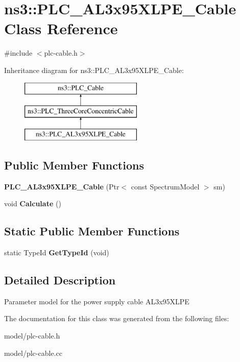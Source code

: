 \hypertarget{classns3_1_1PLC__AL3x95XLPE__Cable}{\section{ns3\-:\-:\-P\-L\-C\-\_\-\-A\-L3x95\-X\-L\-P\-E\-\_\-\-Cable \-Class \-Reference}
\label{classns3_1_1PLC__AL3x95XLPE__Cable}
}


{\ttfamily \#include $<$plc-\/cable.\-h$>$}

\-Inheritance diagram for ns3\-:\-:\-P\-L\-C\-\_\-\-A\-L3x95\-X\-L\-P\-E\-\_\-\-Cable\-:\begin{figure}[H]
\begin{center}
\leavevmode
\includegraphics[height=3.000000cm]{classns3_1_1PLC__AL3x95XLPE__Cable}
\end{center}
\end{figure}
\subsection*{\-Public \-Member \-Functions}
\begin{DoxyCompactItemize}
\item 
\hypertarget{classns3_1_1PLC__AL3x95XLPE__Cable_a7417323df95911e34f8a52aa5b502950}{{\bfseries \-P\-L\-C\-\_\-\-A\-L3x95\-X\-L\-P\-E\-\_\-\-Cable} (\-Ptr$<$ const \-Spectrum\-Model $>$ sm)}\label{classns3_1_1PLC__AL3x95XLPE__Cable_a7417323df95911e34f8a52aa5b502950}

\item 
\hypertarget{classns3_1_1PLC__AL3x95XLPE__Cable_acfbdd88b01ef3ea3e6f89a892d3b1919}{void {\bfseries \-Calculate} ()}\label{classns3_1_1PLC__AL3x95XLPE__Cable_acfbdd88b01ef3ea3e6f89a892d3b1919}

\end{DoxyCompactItemize}
\subsection*{\-Static \-Public \-Member \-Functions}
\begin{DoxyCompactItemize}
\item 
\hypertarget{classns3_1_1PLC__AL3x95XLPE__Cable_a8c2cffd33730a5e137f8595a36dfe7d4}{static \-Type\-Id {\bfseries \-Get\-Type\-Id} (void)}\label{classns3_1_1PLC__AL3x95XLPE__Cable_a8c2cffd33730a5e137f8595a36dfe7d4}

\end{DoxyCompactItemize}


\subsection{\-Detailed \-Description}
\-Parameter model for the power supply cable \-A\-L3x95\-X\-L\-P\-E 

\-The documentation for this class was generated from the following files\-:\begin{DoxyCompactItemize}
\item 
model/plc-\/cable.\-h\item 
model/plc-\/cable.\-cc\end{DoxyCompactItemize}
